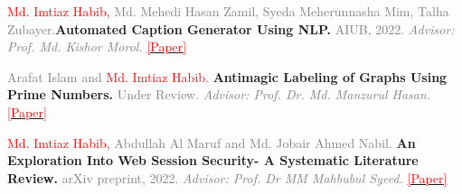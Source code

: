 
\vspace{0.5\baselineskip} %


\begin{mycventry}
    {\textcolor{red}{\fontsize{8.4}{8.4}\textnormal{\hspace{0.7em} \hspace{0.7em}Md. Imtiaz Habib,}} \textcolor{graytext}{\fontsize{8.4}{8.4}\textnormal{Md. Mehedi Hasan Zamil, Syeda Meherunnasha Mim, Talha Zubayer.}}\textcolor{text}{\fontsize{8.4}{8.4}\textbf{Automated Caption Generator Using NLP. }}\textcolor{graytext}{\fontsize{8.4}{8.4}\textnormal{AIUB, 2022. \textit{ Advisor: Prof. Md. Kishor Morol.}}} \href{https://www.researchgate.net/publication/375183559_Automated_Caption_Generator_Using_NLP}{\textcolor{red}{\fontsize{8}{8}\textnormal{   [Paper]}}} \vspace{-\baselineskip}} 
    {}
\end{mycventry}

\vspace{0.5\baselineskip} %


\begin{mycventry}
    {\textcolor{graytext}{\fontsize{8,4}{8.4}\textnormal{\hspace{0.7em} \hspace{0.7em}Arafat Islam and }} \textcolor{red}{\fontsize{8.4}{8.4}\textnormal{Md. Imtiaz Habib.}}\textcolor{text}{\fontsize{8.4}{8.4}\textbf{ Antimagic Labeling of Graphs Using Prime Numbers.}}\textcolor{graytext}{\fontsize{8}{8}\textnormal{ Under Review. \textit{ Advisor: Prof. Dr. Md. Manzurul Hasan. }}}\href{https://www.researchgate.net/publication/375238784_ANTIMAGIC_LABELING_OF_GRAPHS_USING_PRIME_NUMBERS?channel=doi&linkId=6544c01cb1398a779d5887c2&showFulltext=true}{\textcolor{red}{\fontsize{8}{8}\textnormal{   [Paper]}}}\vspace{-\baselineskip}}
    {}
\end{mycventry}


\begin{mycventry}
    {\textcolor{red}{\fontsize{8.4}{8.4}\textnormal{\hspace{0.7em} \hspace{0.7em}Md. Imtiaz Habib,}} \textcolor{graytext}{\fontsize{8,4}{8.4}\textnormal{Abdullah Al Maruf and Md. Jobair Ahmed Nabil.}}\textcolor{text}{\fontsize{8.4}{8.4}\textbf{ An Exploration Into Web Session Security- A Systematic Literature Review.}}\textcolor{graytext}{\fontsize{8}{8}\textnormal{ arXiv preprint, 2022. \textit{ Advisor: Prof. Dr MM Mahbubul Syeed. }}}\href{https://arxiv.org/abs/2310.10687}{\textcolor{red}{\fontsize{8}{8}\textnormal{   [Paper]}}}\vspace{-\baselineskip}}
    {}
\end{mycventry}


\begin{cventries} \vspace{-\baselineskip}

\end{cventries}